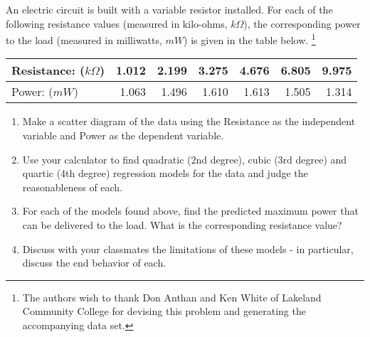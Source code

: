 \documentclass{ximera}
\begin{document}
\begin{problem}\label{circuitexercisepoly}
An electric circuit is built with a variable resistor installed.  For each of the following resistance values (measured in kilo-ohms, $k \Omega$),  the corresponding power to the load (measured in milliwatts, $mW$) is given in the table below. \footnote{The authors wish to thank Don Anthan and Ken White of Lakeland Community College for devising this problem and generating the accompanying data set.}

\noindent \begin{tabular}{|l|r|r|r|r|r|r|} \hline
Resistance: ($k \Omega$) & 1.012 & 2.199 & 3.275 & 4.676 & 6.805 & 9.975 \\ \hline
Power: ($mW$) & 1.063 & 1.496 & 1.610 & 1.613 & 1.505 & 1.314 \\ \hline
\end{tabular}

\begin{enumerate}

\item Make a scatter diagram of the data using the Resistance as the independent variable and Power as the dependent variable.

\item Use your calculator to find quadratic (2nd degree), cubic (3rd degree) and quartic (4th degree) regression models for the data and judge the reasonableness of each.

\item For each of the models found above, find the predicted maximum power that can be delivered to the load.  What is the corresponding resistance value?

\item Discuss with your classmates the limitations of these models - in particular, discuss the end behavior of each.

\end{enumerate}
\end{problem}
\end{document}
